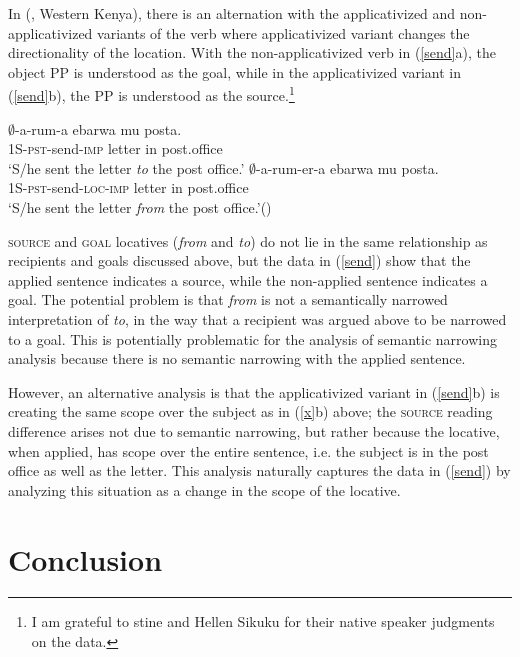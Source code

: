 \documentclass[output=paper]{langsci/langscibook}
\begin{document}
 

 In  (, Western Kenya), there is an alternation with the applicativized and  non-applicativized variants of the verb where applicativized variant changes the directionality of the location. With the non-applicativized verb in (\ref{send}a), the object PP is understood as the goal, while in the applicativized variant in (\ref{send}b), the PP is understood as the source.\footnote{I am grateful to stine and Hellen Sikuku for their native speaker judgments on the  data.}

\begin{exe}
\ex\label{send} 
\begin{xlist}
\ex\gll $\emptyset$-a-rum-a ebarwa mu posta.\\
			{\scshape 1S-pst-}send-{\scshape imp} letter in post.office\\
			\glt `S/he sent the letter \emph{to} the post office.'
\ex\gll $\emptyset$-a-rum-er-a ebarwa mu posta.\\
			{\scshape 1S-pst-}send-{\scshape loc-imp} letter in post.office\\
			\glt `S/he sent the letter \emph{from} the post office.'\hfill ()
			\end{xlist}
\end{exe}
%
 {\scshape source} and {\scshape goal}  locatives (\emph{from} and \emph{to}) do not lie in the same relationship as recipients and goals discussed above, but the data in (\ref{send}) show that the applied sentence indicates a source, while the non-applied sentence indicates a goal. The potential problem is that \emph{from} is not a semantically narrowed interpretation of \emph{to}, in the way that a recipient was argued above to be narrowed to a goal. This is potentially problematic for the analysis of semantic narrowing analysis because there is no semantic narrowing with the applied sentence. 
 
 However, an alternative analysis is that the applicativized variant in (\ref{send}b) is creating the same scope over the subject as in (\ref{x}b) above; the {\scshape source} reading difference arises not due to semantic narrowing, but rather because the locative, when applied, has scope over the entire sentence, i.e. the subject is in the post office as well as the letter. This analysis naturally captures the data in (\ref{send}) by analyzing this situation as a change in the scope of the locative.
 \fi
 \section{Conclusion}%
 \label{sec:jerro:6}
  
\end{document}
